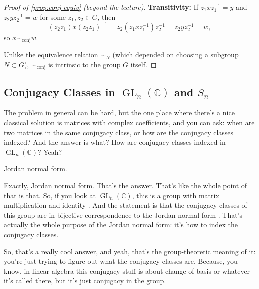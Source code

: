 \begin{content}
\begin{proof}[Proof of \cref{prop:conj-equiv} (beyond the lecture)]
\textbf{Transitivity:} If $z_1 x z_1^{-1} = y$ and $z_2 y z_2^{-1} = w$ for some $z_1, z_2 \in G$, then
\[
(z_2 z_1) x (z_2 z_1)^{-1} = z_2 (z_1 x z_1^{-1}) z_2^{-1} = z_2 y z_2^{-1} = w,
\]
so $x \sim_{\text{conj}} w$.

Unlike the equivalence relation $\sim_N$ (which depended on choosing a subgroup $N \subset G$), $\sim_{\text{conj}}$ is intrinsic to the group $G$ itself.
\end{proof}
\end{content}

\subsection{Conjugacy Classes in \texorpdfstring{$\operatorname{GL}_n(\mathbb{C})$}{GL\_n(C)} and \texorpdfstring{$S_n$}{S\_n}}

\begin{speech}[01:17:21 - 01:18:09]
 The problem in general can be hard, but the one place where there's a nice classical solution is matrices with complex coefficients, and you can ask: when are two matrices in the same conjugacy class, or how are the conjugacy classes indexed? And the answer is what? How are conjugacy classes indexed in $\operatorname{GL}_n(\mathbb{C})$? Yeah?
\end{speech}

\begin{student}
Jordan normal form.
\end{student}

\begin{speech}[01:18:11 - 01:19:03]
Exactly, Jordan normal form. That's the answer. That's like the whole point of that is that. So, if you look at $\operatorname{GL}_n(\mathbb{C})$, this is a group with matrix multiplication and identity . And the statement is that the conjugacy classes of this group are in bijective correspondence to the Jordan normal form . That's actually the whole purpose of the Jordan normal form: it's how to index the conjugacy classes.

So, that's a really cool answer, and yeah, that's the group-theoretic meaning of it: you're just trying to figure out what the conjugacy classes are. Because, you know, in linear algebra this conjugacy stuff is about change of basis or whatever it's called there, but it's just conjugacy in the group.
\end{speech}

